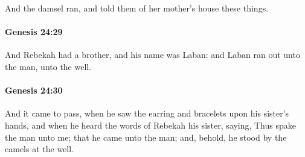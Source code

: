			And the damsel ran, and told them of her mother's house these things.


		\paragraph{Genesis 24:29} %
			\label{GENESIS-24-29}

			And Rebekah had a brother, and his name was Laban: and Laban ran out unto the man, unto the well.


		\paragraph{Genesis 24:30} %
			\label{GENESIS-24-30}

			And it came to pass, when he saw the earring and bracelets upon his sister's hands, and when he heard the words of Rebekah his sister, saying, Thus spake the man unto me; that he came unto the man; and, behold, he stood by the camels at the well.


